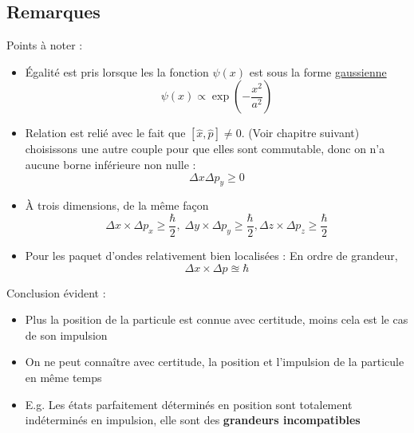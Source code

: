 \subsection{Remarques} %
\label{sub:Remarques}

Points à noter :
\begin{itemize}
\item Égalité est pris lorsque les la fonction $\psi(x)$ est sous la forme \underline{gaussienne}
  \begin{equation}
    \psi(x) \propto \exp \left( - \frac{x ^{2}}{a ^{2}}  \right)
  \end{equation}
    \item Relation est relié avec le fait que $[\hat{x}, \hat{p}] \ne 0$. (Voir chapitre suivant) choisissons une autre couple pour que elles sont commutable, donc on n'a aucune borne inférieure non nulle :
      \begin{equation}
        \Delta x \Delta p_y \ge 0
      \end{equation}

    \item À trois dimensions, de la même façon 
      \begin{equation}
        \boxed{ \Delta x \times \Delta p_x \ge \frac{\hbar}{2}, \; \Delta y \times \Delta p_y \ge \frac{\hbar}{2} , \Delta z \times \Delta p_z \ge \frac{\hbar}{2} }
      \end{equation}

    \item Pour les paquet d'ondes relativement bien localisées : En ordre de grandeur, 
      \begin{equation}
        \Delta x \times \Delta p \approxeq \hbar
      \end{equation}

\end{itemize}

Conclusion évident : 
\begin{itemize}

    \item Plus la position de la particule est connue avec certitude, moins cela est le cas de son impulsion 
    \item On ne peut connaître avec certitude, la position et l'impulsion de la particule en même temps 
    \item E.g. Les états parfaitement déterminés en position sont totalement indéterminés en impulsion, elle sont des \textbf{grandeurs incompatibles}

\end{itemize}

